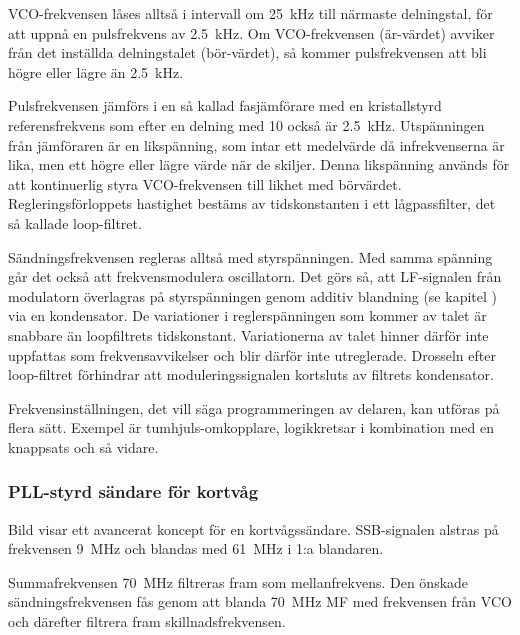 VCO-frekvensen låses alltså i intervall om \qty{25}{\kilo\hertz} till närmaste
delningstal, för att uppnå en pulsfrekvens av \qty{2,5}{\kilo\hertz}.
Om VCO-frekvensen (är-värdet) avviker från det inställda delningstalet
(bör-värdet), så kommer pulsfrekvensen att bli högre eller lägre än
\qty{2,5}{\kilo\hertz}.

Pulsfrekvensen jämförs i en så kallad fasjämförare med en kristallstyrd
referensfrekvens som efter en delning med 10 också är \qty{2,5}{\kilo\hertz}.
Utspänningen från jämföraren är en likspänning, som intar ett
medelvärde då infrekvenserna är lika, men ett högre eller lägre värde
när de skiljer.
Denna likspänning används för att kontinuerlig styra VCO-frekvensen
till likhet med börvärdet.
Regleringsförloppets hastighet bestäms av tidskonstanten i ett
lågpassfilter, det så kallade loop-filtret.

Sändningsfrekvensen regleras alltså med styrspänningen.
Med samma spänning går det också att frekvensmodulera oscillatorn.
Det görs så, att LF-signalen från modulatorn överlagras på styrspänningen genom
additiv blandning (se kapitel ) via en kondensator.
De variationer i reglerspänningen som kommer av talet är snabbare än
loopfiltrets tidskonstant.
Variationerna av talet hinner därför inte uppfattas som frekvensavvikelser och
blir därför inte utreglerade.
Drosseln efter loop-filtret förhindrar att moduleringssignalen
kortsluts av filtrets kondensator.

Frekvensinställningen, det vill säga programmeringen av delaren, kan utföras
på flera sätt. Exempel är tumhjuls-omkopplare,
logikkretsar i kombination med en knappsats och så vida\-re.

\subsubsection{PLL-styrd sändare för kortvåg}


Bild  visar ett avancerat koncept för en kortvågssändare.
SSB-signalen alstras på frekvensen \qty{9}{\mega\hertz} och blandas med
\qty{61}{\mega\hertz} i 1:a blandaren.

Summafrekvensen \qty{70}{\mega\hertz} filtreras fram som mellanfrekvens.
Den önskade sändningsfrekvensen fås genom att blanda \qty{70}{\mega\hertz} MF
med frekvensen från VCO och därefter filtrera fram skillnadsfrekvensen.


